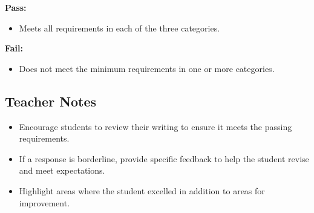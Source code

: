 \documentclass[12pt]{article}
\begin{document}
\begin{tcolorbox}[colframe=black!60, colback=white, title=How to Determine Pass/Fail]
\textbf{Pass:}
\begin{itemize}
    \item Meets all requirements in each of the three categories.
\end{itemize}

\textbf{Fail:}
\begin{itemize}
    \item Does not meet the minimum requirements in one or more categories.
\end{itemize}
\end{tcolorbox}

\subsection*{Teacher Notes}
\begin{itemize}
    \item Encourage students to review their writing to ensure it meets the passing requirements.
    \item If a response is borderline, provide specific feedback to help the student revise and meet expectations.
    \item Highlight areas where the student excelled in addition to areas for improvement.
\end{itemize}
\end{document}
